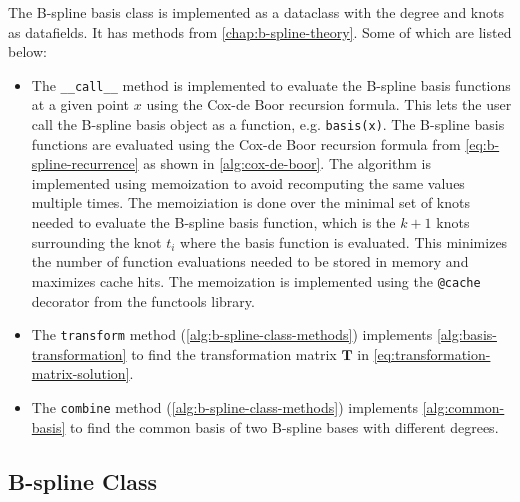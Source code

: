 The B-spline basis class is implemented as a dataclass with the degree and knots as datafields. It has methods from \cref{chap:b-spline-theory}. Some of which are listed below:
\begin{itemize}
    \item 
    The \texttt{\_\_call\_\_} method is implemented to evaluate the B-spline basis functions at a given point $x$ using the Cox-de Boor recursion formula. This lets the user call the B-spline basis object as a function, e.g. \texttt{basis(x)}. The B-spline basis functions are evaluated using the Cox-de Boor recursion formula from \cref{eq:b-spline-recurrence} as shown in \cref{alg:cox-de-boor}. The algorithm is implemented using memoization to avoid recomputing the same values multiple times. The memoiziation is done over the minimal set of knots needed to evaluate the B-spline basis function, which is the $k+1$ knots surrounding the knot $t_i$ where the basis function is evaluated. This minimizes the number of function evaluations needed to be stored in memory and maximizes cache hits. The memoization is implemented using the \texttt{@cache} decorator from the functools library.
    \item
    The \texttt{transform} method (\cref{alg:b-spline-class-methods}) implements \cref{alg:basis-transformation} to find the transformation matrix $\mathbf T$ in \cref{eq:transformation-matrix-solution}.
    \item
    The \texttt{combine} method (\cref{alg:b-spline-class-methods}) implements \cref{alg:common-basis} to find the common basis of two B-spline bases with different degrees. 
\end{itemize}


\FloatBarrier
\subsection{B-spline Class}
